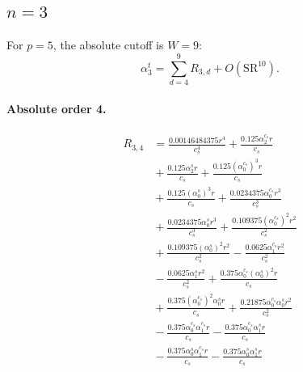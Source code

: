 \documentclass[10pt]{article}
\begin{document}
\subsection{$n=3$}
For $p=5$, the absolute cutoff is $W=9$:
\[\alpha_{3}^t=\sum_{d=4}^{9}R_{3,d}+O(\mathrm{SR}^{10}).\]
\paragraph{Absolute order 4.}
\begin{align*}
R_{3,4} &= \frac{0.00146484375 r^{4}}{c_{s}^{4}} + \frac{0.125 \alpha_{2}^{c_s} r}{c_{s}} \\
&{}  + \frac{0.125 \alpha_{2}^s r}{c_{s}} + \frac{0.125 \left(\alpha_{0}^{c_s}\right)^{3} r}{c_{s}} \\
&{}  + \frac{0.125 \left(\alpha_{0}^s\right)^{3} r}{c_{s}} + \frac{0.0234375 \alpha_{0}^{c_s} r^{3}}{c_{s}^{3}} \\
&{}  + \frac{0.0234375 \alpha_{0}^s r^{3}}{c_{s}^{3}} + \frac{0.109375 \left(\alpha_{0}^{c_s}\right)^{2} r^{2}}{c_{s}^{2}} \\
&{}  + \frac{0.109375 \left(\alpha_{0}^s\right)^{2} r^{2}}{c_{s}^{2}} - \frac{0.0625 \alpha_{1}^{c_s} r^{2}}{c_{s}^{2}} \\
&{}  - \frac{0.0625 \alpha_{1}^s r^{2}}{c_{s}^{2}} + \frac{0.375 \alpha_{0}^{c_s} \left(\alpha_{0}^s\right)^{2} r}{c_{s}} \\
&{}  + \frac{0.375 \left(\alpha_{0}^{c_s}\right)^{2} \alpha_{0}^s r}{c_{s}} + \frac{0.21875 \alpha_{0}^{c_s} \alpha_{0}^s r^{2}}{c_{s}^{2}} \\
&{}  - \frac{0.375 \alpha_{0}^{c_s} \alpha_{1}^{c_s} r}{c_{s}} - \frac{0.375 \alpha_{0}^{c_s} \alpha_{1}^s r}{c_{s}} \\
&{}  - \frac{0.375 \alpha_{0}^s \alpha_{1}^{c_s} r}{c_{s}} - \frac{0.375 \alpha_{0}^s \alpha_{1}^s r}{c_{s}}
\end{align*}
\end{document}
